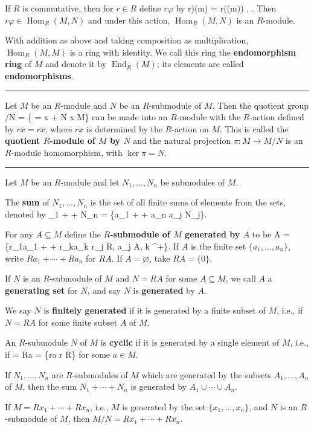 \documentclass[12pt]{article}
\newcommand{\keyword}[1]{\textbf{#1}}
\def\[#1\]{\begin{align*}#1\end{align*}}
\newcommand{\sepline}{\rule{\textwidth}{0.4pt}}
\theoremstyle{definition}
\newcommand{\cfa}[1]{, \qquad \text{for all $#1$}}
\newcommand{\Z}{\mathbb{Z}}
\renewcommand{\phi}{\varphi}
\renewcommand{\emptyset}{\varnothing}
\newcommand{\<}{\left\langle}
\renewcommand{\>}{\right\rangle}
\newcommand{\eqc}{\overline}
\DeclareMathOperator{\Hom}{Hom}
\DeclareMathOperator{\End}{End}
\begin{document}
If $R$ is commutative, then for $r \in R$ define $r\phi$ by
\[
    (r\phi)(m) = r(\phi(m)) \cfa{m \in M}.
\]
Then $r\phi \in \Hom_R(M, N)$ and under this action, $\Hom_R(M, N)$ is an $R$-module.

With addition as above and taking composition as multiplication, $\Hom_R(M, M)$ is a ring with identity. We call this ring the \keyword{endomorphism ring} of $M$ and denote it by $\End_R(M)$; its elements are called \keyword{endomorphisms}.

\sepline

Let $M$ be an $R$-module and $N$ be an $R$-submodule of $M$. Then the quotient group
\[
    M/N = \{\eqc{x} = x + N \mid x \in M\}
\]
can be made into an $R$-module with the $R$-action defined by $r\eqc{x} = \eqc{rx}$, where $rx$ is determined by the $R$-action on $M$. This is called the \keyword{quotient $R$-module of $M$ by $N$} and the natural projection $\pi : M \to M/N$ is an $R$-module homomorphism, with $\ker\pi = N$.

\sepline

Let $M$ be an $R$-module and let $N_1, \dots, N_n$ be submodules of $M$.

The \keyword{sum} of $N_1, \dots, N_n$ is the set of all finite sums of elements from the sets, denoted by
\[
    N_1 + \cdots + N_n = \{a_1 + \cdots + a_n \mid a_j \in N_j\}.
\]

For any $A \subseteq M$ define the \keyword{$R$-submodule of $M$ generated by $A$} to be
\[
    RA = \{r_1a_1 + \cdots + r_ka_k \mid r_j \in R,\; a_j \in A,\; k \in \Z^+\}.
\]
If $A$ is the finite set $\{a_1, \dots, a_n\}$, write $Ra_1 + \cdots + Ra_n$ for $RA$. If $A = \emptyset$, take $RA = \{0\}$.

If $N$ is an $R$-submodule of $M$ and $N = RA$ for some $A \subseteq M$, we call $A$ a \keyword{generating set} for $N$, and say $N$ is \keyword{generated} by $A$.

We say $N$ is \keyword{finitely generated} if it is generated by a finite subset of $M$, i.e., if $N = RA$ for some finite subset $A$ of $M$.

An $R$-submodule $N$ of $M$ is \keyword{cyclic} if it is generated by a single element of $M$, i.e., if 
\[
    N = Ra = \{ra \mid r \in R\}
\]
for some $a \in M$.

If $N_1, \dots, N_n$ are $R$-submodules of $M$ which are generated by the subsets $A_1, \dots, A_n$ of $M$, then the sum $N_1 + \cdots + N_n$ is generated by $A_1 \cup \cdots \cup A_n$.

If $M = Rx_1 + \cdots + Rx_n$, i.e., $M$ is generated by the set $\{x_1, \dots, x_n\}$, and $N$ is an $R$-submodule of $M$, then $M/N = R\eqc{x_1} + \cdots + R\eqc{x_n}$.
\end{document}
